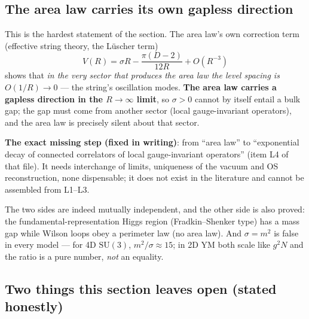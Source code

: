 \subsection{The area law carries its own gapless direction}

This is the hardest statement of the section. The area law's own correction term (effective string
theory, the Lüscher term)
\begin{equation}
  V(R)=\sigma R-\frac{\pi(D-2)}{12R}+O(R^{-3})
\end{equation}
shows that \emph{in the very sector that produces the area law the level spacing is
$O(1/R)\to0$} --- the string's oscillation modes. \textbf{The area law carries a gapless direction in
the $R\to\infty$ limit}, so $\sigma>0$ cannot by itself entail a bulk gap; the gap must come from
another sector (local gauge-invariant operators), and the area law is precisely silent about that
sector. \LT
{}

\noindent
\textbf{The exact missing step (fixed in writing)}: from ``area law'' to ``exponential decay of
connected correlators of local gauge-invariant operators'' (item L4 of that file). It needs
interchange of limits, uniqueness of the vacuum and OS reconstruction, none dispensable; it does not
exist in the literature and cannot be assembled from L1--L3. \LM
{}

\noindent
The two sides are indeed mutually independent, and the other side is also proved: the
fundamental-representation Higgs region (Fradkin--Shenker type) has a mass gap while Wilson loops obey
a perimeter law (no area law). And $\sigma=m^{2}$ is false in every model --- for 4D
$\mathrm{SU}(3)$, $m^{2}/\sigma\approx15$; in 2D YM both scale like $g^{2}N$ and the ratio is a pure
number, \emph{not} an equality. \LT
{}

\subsection{Two things this section leaves open (stated honestly)}

